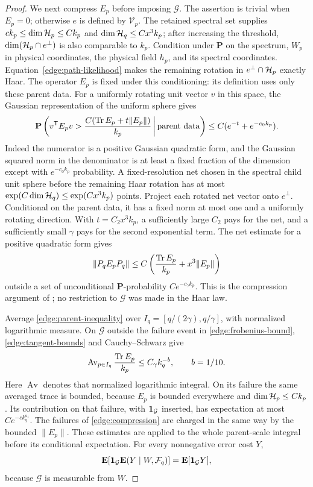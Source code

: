 \begin{proof}
We next compress \(E_p\) before imposing \(\mathcal G\).  The assertion
is trivial when \(E_p=0\); otherwise \(e\) is defined by
\(\mathcal V_p\).  The retained spectral set supplies
\(ck_p\le\dim\mathcal H_p\le Ck_p\) and
\(\dim\mathcal H_q\le Cx^3k_p\); after increasing the threshold,
\(\dim(\mathcal H_p\cap e^\perp)\) is also comparable to \(k_p\).
Condition
under \(\mathbf P\) on the spectrum, \(W_p\) in physical coordinates,
the physical field \(h_p\), and its spectral coordinates.
Equation~\eqref{edge:path-likelihood} makes the remaining rotation in
\(e^\perp\cap\mathcal H_p\) exactly Haar.  The operator \(E_p\) is fixed
under this conditioning: its definition uses only these parent data.
For a uniformly rotating unit vector \(v\) in this space, the Gaussian
representation of the uniform sphere gives
\[
 \mathbf P\left(
 v^{\mathsf T}E_pv>
       \frac{C(\operatorname{Tr} E_p+t\|E_p\|)}{k_p}
       \,\middle|\,\text{parent data}\right)
       \le C(e^{-t}+e^{-c_0k_p}).
\]
Indeed the numerator is a positive Gaussian quadratic form, and the
Gaussian squared norm in the denominator is at least a fixed fraction
of the dimension except with \(e^{-c_0k_p}\) probability.
A fixed-resolution net chosen in the spectral child unit sphere before
the remaining Haar rotation has at most
\(\exp(C\dim\mathcal H_q)\le\exp(Cx^3k_p)\) points.  Project each rotated
net vector onto \(e^\perp\).  Conditional on the parent data, it has
a fixed norm at most one and a uniformly rotating direction.  With
\(t=C_2x^3k_p\), a sufficiently large \(C_2\) pays for the net, and
a sufficiently small \(\gamma\) pays for the second exponential term.
The net estimate for a positive quadratic form gives
\begin{equation}\label{edge:compression}
 \|P_qE_pP_q\|
 \le C\left(\frac{\operatorname{Tr} E_p}{k_p}+x^3\|E_p\|\right)
\end{equation}
outside a set of unconditional \(\mathbf P\)-probability
\(Ce^{-c_\gamma k_p}\).  This is the compression argument of
\cite[Lemma~4.5, Equation~(4.6)]{FUA}; no restriction to \(\mathcal G\)
was made in the Haar law.

Average \eqref{edge:parent-inequality} over
\(I_q=[q/(2\gamma),q/\gamma]\), with normalized logarithmic measure.
On \(\mathcal G\) outside the failure event in \eqref{edge:frobenius-bound},
\eqref{edge:tangent-bounds} and Cauchy--Schwarz give
\[
 \operatorname{Av}_{p\in I_q}\frac{\operatorname{Tr} E_p}{k_p}
       \le C_\gamma k_q^{-b},\qquad b=1/10.
\]
Here \(\operatorname{Av}\) denotes that normalized logarithmic integral.
On its failure the same averaged trace is bounded, because \(E_p\) is
bounded everywhere and \(\dim\mathcal H_p\le Ck_p\).
Its contribution on that failure, with \(\mathbf 1_{\mathcal G}\) inserted,
has expectation at most
\(Ce^{-c k_q^{a_1}}\).  The failures of
\eqref{edge:compression} are charged in the same way by the bounded
\(\|E_p\|\).  These estimates are applied to the whole parent-scale
integral before its conditional expectation.  For every nonnegative
error cost \(Y\),
\begin{equation}\label{edge:conditioning-good-event}
 \mathbf E[\mathbf 1_{\mathcal G}\mathbf E(Y\mid W,\mathcal F_q)]
       =\mathbf E[\mathbf 1_{\mathcal G}Y],
\end{equation}
because \(\mathcal G\) is measurable from \(W\).


\end{proof}
